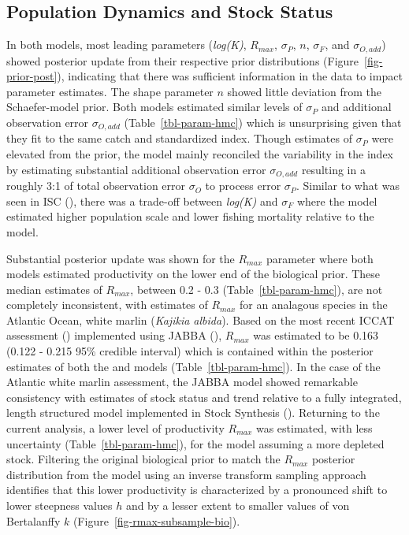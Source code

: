 \documentclass[
  11pt,
]{SCreport}
\begin{document}
\subsection{Population Dynamics and Stock
Status}\label{sec-stock-status}

In both models, most leading parameters (\emph{log(K)}, \(R_{max}\),
\(\sigma_P\), \(n\), \(\sigma_F\), and \(\sigma_{O,add}\)) showed
posterior update from their respective prior distributions
(Figure~\ref{fig-prior-post}), indicating that there was sufficient
information in the data to impact parameter estimates. The shape
parameter \(n\) showed little deviation from the Schaefer-model prior.
Both models estimated similar levels of \(\sigma_P\) and additional
observation error \(\sigma_{O,add}\) (Table~\ref{tbl-param-hmc}) which
is unsurprising given that they fit to the same catch and standardized
index. Though estimates of \(\sigma_P\) were elevated from the prior,
the model mainly reconciled the variability in the index by estimating
substantial additional observation error \(\sigma_{O,add}\) resulting in
a roughly 3:1 of total observation error \(\sigma_O\) to process error
\(\sigma_P\). Similar to what was seen in ISC
(), there was a trade-off between
\emph{log(K)} and \(\sigma_F\) where the
 model estimated higher population
scale and lower fishing mortality relative to the
 model.

Substantial posterior update was shown for the \(R_{max}\) parameter
where both models estimated productivity on the lower end of the
biological prior. These median estimates of \(R_{max}\), between 0.2 -
0.3 (Table~\ref{tbl-param-hmc}), are not completely inconsistent, with
estimates of \(R_{max}\) for an analagous species in the Atlantic Ocean,
white marlin (\emph{Kajikia albida}). Based on the most recent ICCAT
assessment () implemented
using JABBA (),
\(R_{max}\) was estimated to be 0.163 (0.122 - 0.215 95\% credible
interval) which is contained within the posterior estimates of both the
 and 
models (Table~\ref{tbl-param-hmc}). In the case of the Atlantic white
marlin assessment, the JABBA model showed remarkable consistency with
estimates of stock status and trend relative to a fully integrated,
length structured model implemented in Stock Synthesis
(). Returning to the
current analysis, a lower level of productivity \(R_{max}\) was
estimated, with less uncertainty (Table~\ref{tbl-param-hmc}), for the
 model assuming a more depleted stock.
Filtering the original biological prior to match the \(R_{max}\)
posterior distribution from the  model
using an inverse transform sampling approach identifies that this lower
productivity is characterized by a pronounced shift to lower steepness
values \(h\) and by a lesser extent to smaller values of von Bertalanffy
\(k\) (Figure~\ref{fig-rmax-subsample-bio}).
\end{document}
